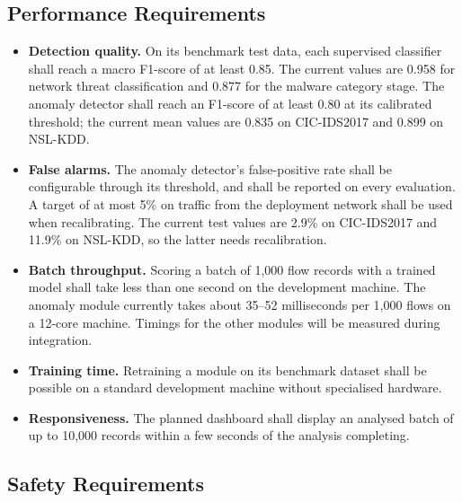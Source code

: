 \subsection{Performance Requirements}

\begin{itemize}
   \setlength{\itemsep}{1pt}
   \setlength{\parskip}{0pt}
   \setlength{\parsep}{0pt}
   \item \textbf{Detection quality.} On its benchmark test data, each supervised classifier shall reach a macro F1-score of at least 0.85. The current values are 0.958 for network threat classification and 0.877 for the malware category stage. The anomaly detector shall reach an F1-score of at least 0.80 at its calibrated threshold; the current mean values are 0.835 on CIC-IDS2017 and 0.899 on NSL-KDD.
   \item \textbf{False alarms.} The anomaly detector's false-positive rate shall be configurable through its threshold, and shall be reported on every evaluation. A target of at most 5\% on traffic from the deployment network shall be used when recalibrating. The current test values are 2.9\% on CIC-IDS2017 and 11.9\% on NSL-KDD, so the latter needs recalibration.
   \item \textbf{Batch throughput.} Scoring a batch of 1,000 flow records with a trained model shall take less than one second on the development machine. The anomaly module currently takes about 35--52 milliseconds per 1,000 flows on a 12-core machine. Timings for the other modules will be measured during integration.
   \item \textbf{Training time.} Retraining a module on its benchmark dataset shall be possible on a standard development machine without specialised hardware.
   \item \textbf{Responsiveness.} The planned dashboard shall display an analysed batch of up to 10,000 records within a few seconds of the analysis completing.
\end{itemize}

\subsection{Safety Requirements}

